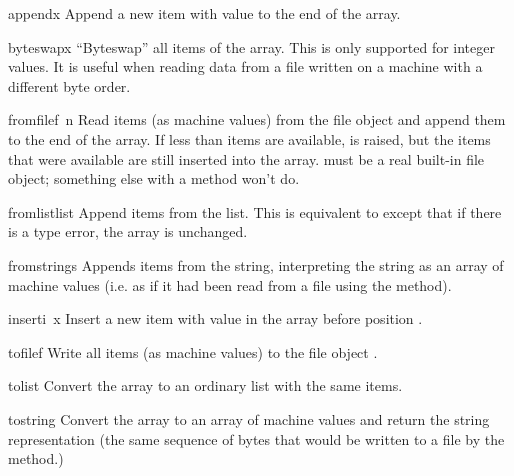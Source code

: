 \begin{funcdesc}{append}{x}
Append a new item with value  to the end of the array.
\end{funcdesc}

\begin{funcdesc}{byteswap}{x}
``Byteswap'' all items of the array.  This is only supported for
integer values.  It is useful when reading data from a file written
on a machine with a different byte order.
\end{funcdesc}

\begin{funcdesc}{fromfile}{f\, n}
Read  items (as machine values) from the file object 
and append them to the end of the array.  If less than  items
are available,  is raised, but the items that were
available are still inserted into the array.   must be a real
built-in file object; something else with a  method won't
do.
\end{funcdesc}

\begin{funcdesc}{fromlist}{list}
Append items from the list.  This is equivalent to
except that if there is a type error, the array is unchanged.
\end{funcdesc}

\begin{funcdesc}{fromstring}{s}
Appends items from the string, interpreting the string as an
array of machine values (i.e. as if it had been read from a
file using the  method).
\end{funcdesc}

\begin{funcdesc}{insert}{i\, x}
Insert a new item with value  in the array before position
.
\end{funcdesc}

\begin{funcdesc}{tofile}{f}
Write all items (as machine values) to the file object .
\end{funcdesc}

\begin{funcdesc}{tolist}{}
Convert the array to an ordinary list with the same items.
\end{funcdesc}

\begin{funcdesc}{tostring}{}
Convert the array to an array of machine values and return the
string representation (the same sequence of bytes that would
be written to a file by the  method.)
\end{funcdesc}

